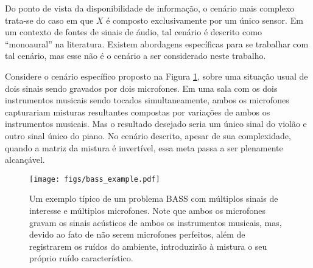 


Do ponto de vista da disponibilidade de informação, o cenário mais complexo trata-se do caso em que $X$ é composto exclusivamente por um único sensor. Em um contexto de fontes de sinais de áudio, tal cenário é descrito como ``monoaural'' na literatura. Existem abordagens específicas para se trabalhar com tal cenário, mas esse não é o cenário a ser considerado neste trabalho.


Considere o cenário específico proposto na Figura \ref{fig:bass_example}, sobre uma situação usual de dois sinais sendo gravados por dois microfones. Em uma sala com os dois instrumentos musicais sendo tocados simultaneamente, ambos os microfones capturariam misturas resultantes compostas por variações de ambos os instrumentos musicais. Mas o resultado desejado seria um único sinal do violão e outro sinal único do piano. No cenário descrito, apesar de sua complexidade, quando a matriz da mistura é invertível, essa meta passa a ser plenamente alcançável.

\begin{figure}[H]
    \centering
    \texttt{[image: figs/bass\_example.pdf]}
    \caption{Um exemplo típico de um problema BASS com múltiplos sinais de interesse e múltiplos microfones. Note que ambos os microfones gravam os sinais acústicos de ambos os instrumentos musicais, mas, devido ao fato de não serem microfones perfeitos, além de registrarem os ruídos do ambiente, introduzirão à mistura o seu próprio ruído característico.}
    \label{fig:bass_example}
\end{figure}

